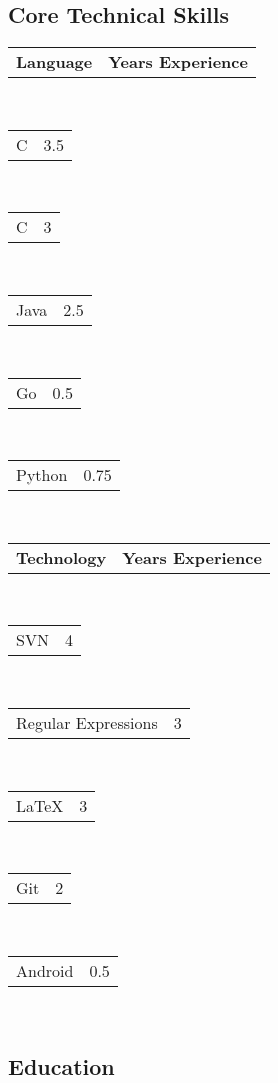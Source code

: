 \documentclass[10pt,letterpaper]{article}
\makeatletter
\newenvironment{indentsection}[1]%
{\begin{list}{}%
  {\setlength{\leftmargin}{#1}}%
  \item[]%
}
{\end{list}}
\newcommand{\headerrow}[2]
{\begin{tabular*}{\linewidth}{l@{\extracolsep{\fill}}r}
  #1 &
  #2 \\
\end{tabular*}}
\newcommand{\CPP}
{C\nolinebreak[4]\hspace{-.05em}\raisebox{.22ex}{\footnotesize\bf ++}}
\makeatother
\begin{document}
\subsection*{Core Technical Skills}

\begin{indentsection}{\parindent}
\begin{multicols}{2}
  \headerrow {\textbf{Language}} {\textbf{Years Experience}}\\
  \headerrow {\CPP} {3.5}\\
  \headerrow {C} {3}\\
  \headerrow {Java} {2.5}\\
  \headerrow {Go} {0.5}\\
  \headerrow {Python} {0.75}\\


  \headerrow {\textbf{Technology}} {\textbf{Years Experience}}\\
  \headerrow {SVN} {4}\\
  \headerrow {Regular Expressions} {3}\\
  \headerrow {\LaTeX} {3}\\
  \headerrow {Git} {2}\\
  \headerrow {Android} {0.5}\\
\end{multicols}
\end{indentsection}

\newpage

\subsection*{Education}
\end{document}
